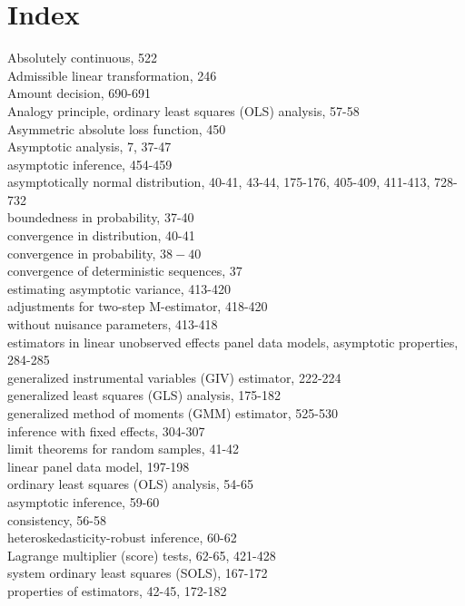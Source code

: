 \documentclass[10pt]{article}
\begin{document}
\section*{Index}
Absolutely continuous, 522\\
Admissible linear transformation, 246\\
Amount decision, 690-691\\
Analogy principle, ordinary least squares (OLS) analysis, 57-58\\
Asymmetric absolute loss function, 450\\
Asymptotic analysis, 7, 37-47\\
asymptotic inference, 454-459\\
asymptotically normal distribution, 40-41, 43-44, 175-176, 405-409, 411-413, 728-732\\
boundedness in probability, 37-40\\
convergence in distribution, 40-41\\
convergence in probability, $38-40$\\
convergence of deterministic sequences, 37\\
estimating asymptotic variance, 413-420\\
adjustments for two-step M-estimator, 418-420\\
without nuisance parameters, 413-418\\
estimators in linear unobserved effects panel data models, asymptotic properties, 284-285\\
generalized instrumental variables (GIV) estimator, 222-224\\
generalized least squares (GLS) analysis, 175-182\\
generalized method of moments (GMM) estimator, 525-530\\
inference with fixed effects, 304-307\\
limit theorems for random samples, 41-42\\
linear panel data model, 197-198\\
ordinary least squares (OLS) analysis, 54-65\\
asymptotic inference, 59-60\\
consistency, 56-58\\
heteroskedasticity-robust inference, 60-62\\
Lagrange multiplier (score) tests, 62-65, 421-428\\
system ordinary least squares (SOLS), 167-172\\
properties of estimators, 42-45, 172-182\\
\end{document}
